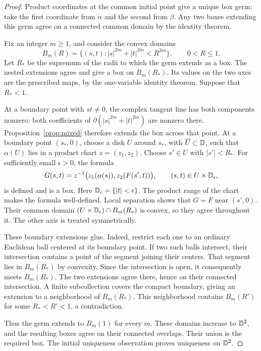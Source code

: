 \begin{proof}
Product coordinates at the common initial point give a unique box germ:
take the first coordinate from \(\alpha\) and the second from \(\beta\).
Any two boxes extending this germ agree on a connected common domain by
the identity theorem.

Fix an integer \(m\geq1\), and consider the convex domains
\[
 B_m(R)=\{(s,t):|s|^{2m}+|t|^{2m}<R^{2m}\},\qquad 0<R\leq1.
\]
Let \(R_*\) be the supremum of the radii to which the germ extends as
a box. The nested extensions agree and give a box on \(B_m(R_*)\).
Its values on the two axes are the prescribed maps, by the one-variable
identity theorem. Suppose that \(R_*<1\).

At a boundary point with \(st\neq0\), the complex tangent line has both
components nonzero: both coefficients of
\(\partial(|s|^{2m}+|t|^{2m})\) are nonzero there. Proposition~\ref{prop:mixed}
therefore extends the box across that point.
At a boundary point \((s_*,0)\), choose a disk \(U\) around \(s_*\),
with \(\overline U\subset\mathbb D\), such that \(\alpha(U)\) lies in a
product chart \(z=(z_1,z_2)\). Choose \(s'\in U\) with
\(|s'|<R_*\). For sufficiently small \(\epsilon>0\), the formula
\[
 G(s,t)=z^{-1}\bigl(z_1(\alpha(s)),z_2(F(s',t))\bigr),
 \qquad (s,t)\in U\times\mathbb D_\epsilon,
\]
is defined and is a box. Here \(\mathbb D_\epsilon=\{|t|<\epsilon\}\).
The product range of the chart makes the formula well-defined. Local
separation shows that \(G=F\) near \((s',0)\). Their common domain
\((U\times\mathbb D_\epsilon)\cap B_m(R_*)\) is convex, so they agree
throughout it. The other axis is treated symmetrically.

These boundary extensions glue. Indeed, restrict each one to an ordinary
Euclidean ball centered at its boundary point. If two such balls intersect,
their intersection contains a point of the segment joining their centers.
That segment lies in \(\overline{B_m(R_*)}\) by convexity. Since the
intersection is open, it consequently meets \(B_m(R_*)\). The two
extensions agree there, hence on their connected intersection. A finite
subcollection covers the compact boundary, giving an extension to a
neighborhood of \(\overline{B_m(R_*)}\). This neighborhood contains
\(B_m(R')\) for some \(R_*<R'<1\), a contradiction.

Thus the germ extends to \(B_m(1)\) for every \(m\). These domains
increase to \(\mathbb D^2\), and the resulting boxes agree on their connected
overlaps. Their union is the required box. The initial uniqueness
observation proves uniqueness on \(\mathbb D^2\).
\end{proof}

